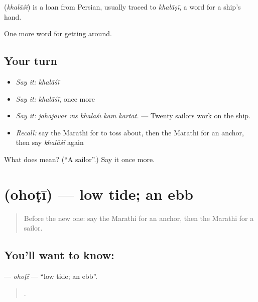 \begin{cousinweb}
\textbf{} (\emph{khalāśī}) is a loan from Persian, usually traced to \emph{khalāṣī}, a word for a ship's hand.
\end{cousinweb}

\begin{grammarlens}[title={What you've built}]
One more word for getting around.
\end{grammarlens}

\subsection*{Your turn}
\begin{itemize}
\raggedright
  \item \emph{Say it:} \emph{khalāśī}
  \item \emph{Say it:} \emph{khalāśī}, once more
  \item \emph{Say it:} \emph{jahājāvar vīs khalāśī kām kartāt.} — Twenty sailors work on the ship.
  \item \emph{Recall:} say the Marathi for to toss about, then the Marathi for an anchor, then say \emph{khalāśī} again
\end{itemize}

\begin{tcolorbox}[breakable,colback=teal!4,colframe=teal!35!black,title={Before you move on}]
What does  mean? (\textquotedblleft{}A sailor\textquotedblright{}.) Say it once more.
\end{tcolorbox}
\section[\texorpdfstring{\mr{ओहोटी} (ohoṭī)}{ओहोटी (ohoṭī)}]{ (ohoṭī) — low tide; an ebb}

\label{lesson:MR-C409-ohoti}



\begin{quote}
Before the new one: say the Marathi for an anchor, then the Marathi for a sailor.
\end{quote}

\subsection*{You'll want to know: }
\textbf{} — \emph{ohoṭī} — \textquotedblleft{}low tide; an ebb\textquotedblright{}.

\begin{quote}
   .
\end{quote}

